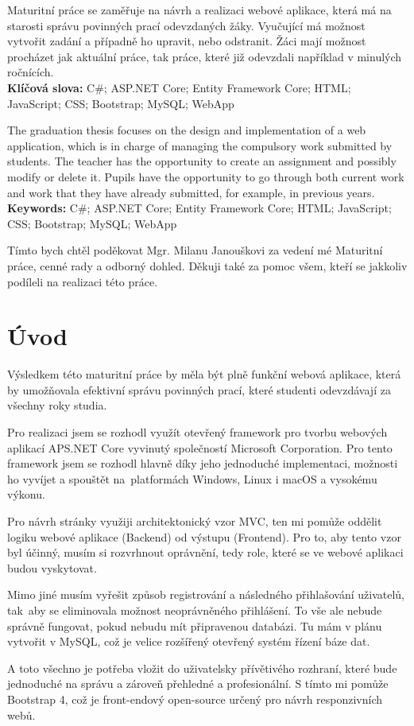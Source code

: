 \documentclass[a4paper, 12pt]{report}
\begin{document}
	\titulniStrana
	
	\anotace Maturitní práce se zaměřuje na návrh a realizaci webové aplikace, která má na starosti správu povinných prací odevzdaných žáky. Vyučující má možnost vytvořit zadání a případně ho upravit, nebo odstranit. Žáci mají možnost procházet jak aktuální práce, tak práce, které již odevzdali například v minulých ročnících. \\
	\textbf{Klíčová slova: } C\#; ASP.NET Core; Entity Framework Core; HTML; JavaScript; CSS; Bootstrap; MySQL; WebApp

	\annotation The graduation thesis focuses on the design and implementation of a web application, which is in charge of managing the compulsory work submitted by students. The teacher has the opportunity to create an assignment and possibly modify or delete it. Pupils have the opportunity to go through both current work and work that they have already submitted, for example, in previous years.\\
	\textbf{Keywords: } C\#; ASP.NET Core; Entity Framework Core; HTML; JavaScript; CSS; Bootstrap; MySQL; WebApp

	\podekovani Tímto bych chtěl poděkovat Mgr. Milanu Janouškovi za vedení mé Maturitní práce, cenné rady a odborný dohled. Děkuji také za pomoc všem, kteří se jakkoliv podíleli na realizaci této práce.
	
	\obsah

	\chapter{Úvod}
    Výsledkem této maturitní práce by měla být plně funkční webová aplikace, která by umožňovala efektivní správu povinných prací, které studenti odevzdávají za všechny roky studia.\par
	Pro realizaci jsem se rozhodl využít otevřený framework pro tvorbu webových aplikací APS.NET Core vyvinutý společností Microsoft Corporation. Pro tento framework jsem se rozhodl hlavně díky jeho jednoduché implementaci, možnosti ho vyvíjet a spouštět na~platformách Windows, Linux i macOS a vysokému výkonu.\par
	Pro návrh stránky využiji architektonický vzor MVC, ten mi pomůže oddělit logiku webové aplikace (Backend) od výstupu (Frontend). Pro to, aby tento vzor byl účinný, musím si rozvrhnout oprávnění, tedy role, které se ve webové aplikaci budou vyskytovat.\par
	Mimo jiné musím vyřešit způsob registrování a následného přihlašování uživatelů, tak~aby se eliminovala možnost neoprávněného přihlášení. To vše ale nebude správně fungovat, pokud nebudu mít připravenou databázi. Tu mám v plánu vytvořit v MySQL, což je velice rozšířený otevřený systém řízení báze dat.\par
	A toto všechno je potřeba vložit do uživatelsky přívětivého rozhraní, které bude jednoduché na správu a zároveň přehledné a profesionální. S tímto mi pomůže Bootstrap 4, což je front-endový open-source určený pro návrh responzivních webů.
\end{document}
